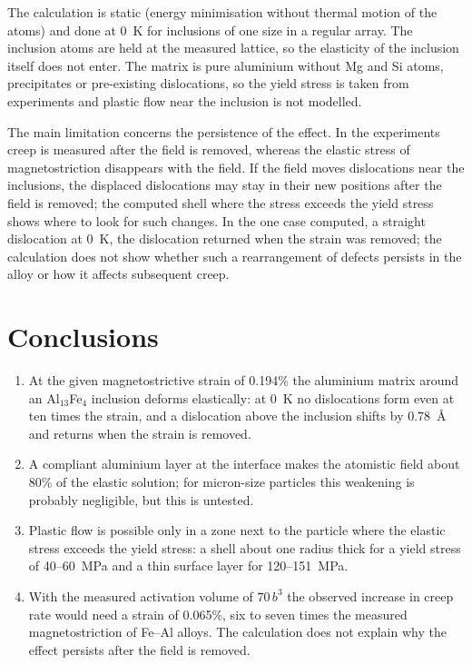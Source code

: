 \documentclass[11pt,a4paper]{article}
\begin{document}
The calculation is static (energy minimisation without thermal motion of
the atoms) and done at 0~K for inclusions of one size in a regular array.
The inclusion atoms are held at the measured lattice, so the elasticity of
the inclusion itself does not enter. The matrix is pure aluminium without Mg
and Si atoms, precipitates or pre-existing dislocations, so the yield stress
is taken from experiments \cite{Friha2024JMMM,Skvortsov2019JAP,Pshonkin2025ZL}
and plastic flow near the inclusion is not modelled.

The main limitation concerns the persistence of the effect. In the experiments creep is
measured after the field is removed, whereas the elastic stress of
magnetostriction disappears with the field. If the field moves dislocations
near the inclusions, the displaced dislocations may stay in their new positions
after the field is removed; the computed shell where the stress exceeds the
yield stress shows where to look for such changes.
In the one case computed, a straight dislocation at 0~K, the dislocation
returned when the strain was removed; the calculation does not show whether
such a rearrangement of defects persists in the alloy or how it affects
subsequent creep.

\section{Conclusions}

\begin{enumerate}
\item At the given magnetostrictive strain of 0.194\% the aluminium matrix
around an Al$_{13}$Fe$_4$ inclusion deforms elastically: at 0~K no
dislocations form even at ten times the strain, and a dislocation above the
inclusion shifts by 0.78~\AA{} and returns when the strain is
removed.
\item A compliant aluminium layer at the interface makes the atomistic
field about 80\% of the elastic solution; for micron-size particles
this weakening is probably negligible, but this is untested.
\item Plastic flow is possible only in a zone next to the particle where
the elastic stress exceeds the yield stress: a shell about one radius thick
for a yield stress of 40--60~MPa and a thin surface layer for
120--151~MPa.
\item With the measured activation volume of $70\,b^3$ the observed
increase in creep rate would need a strain of 0.065\%, six to seven
times the measured magnetostriction of Fe--Al alloys. The calculation does
not explain why the effect persists after the field is removed.
\end{enumerate}
\end{document}
